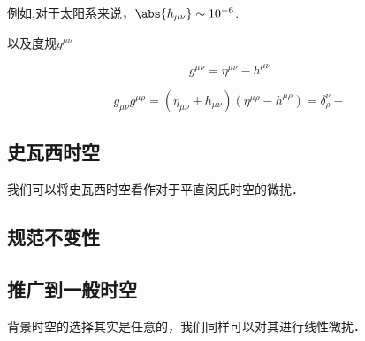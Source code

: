 例如,对于太阳系来说，$\abs{h_{\mu\nu}} \sim 10^{-6}$.

以及度规$g^{\mu\nu}$

\begin{equation}
g^{\mu\nu} = \eta^{\mu\nu} - h^{\mu\nu}
\end{equation}

\begin{equation}
g_{\mu\nu}g^{\mu\rho} = (\eta_{\mu\nu} + h_{\mu\nu})(\eta^{\mu\rho} - h^{\mu\rho}) = \delta^{\nu}_{\rho} - 
\end{equation}



\subsection{史瓦西时空}

我们可以将史瓦西时空看作对于平直闵氏时空的微扰．


\subsection{规范不变性}


\subsection{推广到一般时空}

背景时空的选择其实是任意的，我们同样可以对其进行线性微扰．

